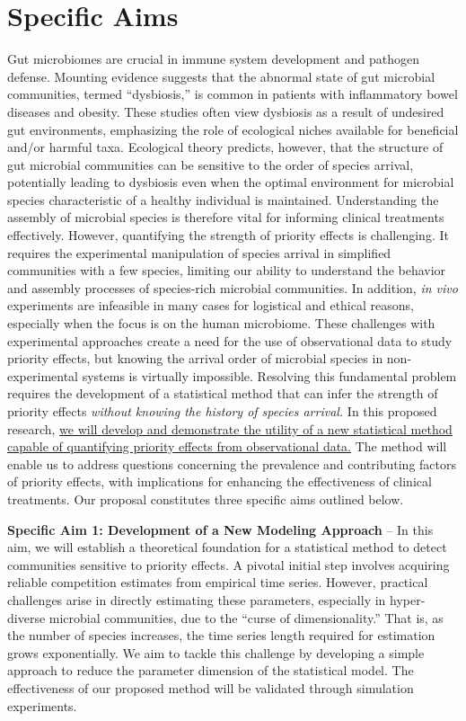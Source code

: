 \documentclass[12pt, class=article, crop=false]{standalone}
\begin{document}
\section*{Specific Aims}

Gut microbiomes are crucial in immune system development and pathogen defense.
Mounting evidence suggests that the abnormal state of gut microbial communities, termed ``dysbiosis,'' is common in patients with inflammatory bowel diseases and obesity.
These studies often view dysbiosis as a result of undesired gut environments, emphasizing the role of ecological niches available for beneficial and/or harmful taxa.
Ecological theory predicts, however, that the structure of gut microbial communities can be sensitive to the order of species arrival, potentially leading to dysbiosis even when the optimal environment for microbial species characteristic of a healthy individual is maintained.
Understanding the assembly of microbial species is therefore vital for informing clinical treatments effectively.
However, quantifying the strength of priority effects is challenging.
It requires the experimental manipulation of species arrival in simplified communities with a few species, limiting our ability to understand the behavior and assembly processes of species-rich microbial communities.
In addition, \textit{in vivo} experiments are infeasible in many cases for logistical and ethical reasons, especially when the focus is on the human microbiome.
These challenges with experimental approaches create a need for the use of observational data to study priority effects, but knowing the arrival order of microbial species in non-experimental systems is virtually impossible.
Resolving this fundamental problem requires the development of a statistical method that can infer the strength of priority effects \textit{without knowing the history of species arrival.}
In this proposed research, \ul{we will develop and demonstrate the utility of a new statistical method capable of quantifying priority effects from observational data.}
The method will enable us to address questions concerning the prevalence and contributing factors of priority effects, with implications for enhancing the effectiveness of clinical treatments.
Our proposal constitutes three specific aims outlined below.

\textbf{Specific Aim 1: Development of a New Modeling Approach} --
In this aim, we will establish a theoretical foundation for a statistical method to detect communities sensitive to priority effects.
A pivotal initial step involves acquiring reliable competition estimates from empirical time series. However, practical challenges arise in directly estimating these parameters, especially in hyper-diverse microbial communities, due to the ``curse of dimensionality.''
That is, as the number of species increases, the time series length required for estimation grows exponentially.
We aim to tackle this challenge by developing a simple approach to reduce the parameter dimension of the statistical model.
The effectiveness of our proposed method will be validated through simulation experiments.
\end{document}

